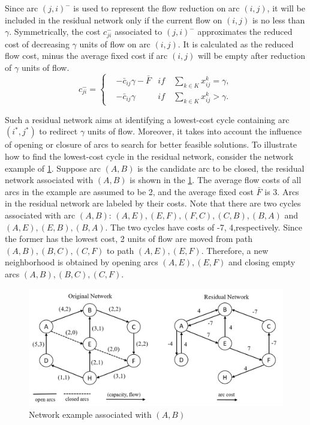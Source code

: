 \documentclass[11pt,nonblindrev,fleqn]{article}
\begin{document}
Since arc $(j,i)^-$ is used to represent the flow reduction on arc $(i,j)$, it will be included in the residual network only if the current flow on $(i,j)$ is no less than $\gamma$. Symmetrically, the cost $c_{ji}^-$ associated to $(j,i)^-$ approximates the reduced cost of decreasing $\gamma$ units of flow on arc $(i,j)$. It is calculated as the reduced flow cost, minus the average fixed cost if arc $(i,j)$ will be empty after reduction of $\gamma$ units of flow.
\begin{equation*}
c_{ji}^- = \left\{
\begin{aligned}
&-\bar{c}_{ij} \gamma - \bar{F}  &if \ & \sum_{k\in K} x_{ij}^k = \gamma, \\
&-\bar{c}_{ij} \gamma                  &if \ &\sum_{k\in K} x_{ij}^k > \gamma.
\end{aligned}
\right.
\end{equation*}

Such a residual network aims at identifying a lowest-cost cycle containing arc $(i^*,j^*)$ to redirect $\gamma$ units of flow. Moreover, it takes into account the influence of opening or closure of arcs to search for better feasible solutions. To illustrate how to find the lowest-cost cycle in the residual network, consider the network example of \ref{NetworkExample}. Suppose arc $(A,B)$ is the candidate arc to be closed, the residual network associated with $(A,B)$ is shown in the \ref{NetworkExample}. The average flow costs of all arcs in the example are assumed to be 2, and the average fixed cost $\bar{F}$ is 3. Arcs in the residual network are labeled by their costs. Note that there are two cycles associated with arc $(A,B)$: $(A,E),(E,F),(F,C),(C,B),(B,A)$ and $(A,E),(E,B),(B,A)$. The two cycles have costs of -7, 4,respectively. Since the former has the lowest cost, 2 units of flow are moved from path $(A,B),(B,C),(C,F)$ to path $(A,E),(E,F)$. Therefore, a new neighborhood is obtained by opening arcs $(A,E),(E,F)$ and closing empty arcs $(A,B),(B,C),(C,F)$.
\begin{figure}[H]
\setlength{\abovecaptionskip}{-5pt}
\setlength{\belowcaptionskip}{-5pt}
\centering
\includegraphics[width=0.9\linewidth]{F4.png}
\caption{\small Network example associated with $(A,B)$}
\label{NetworkExample}
\end{figure}
\end{document}

